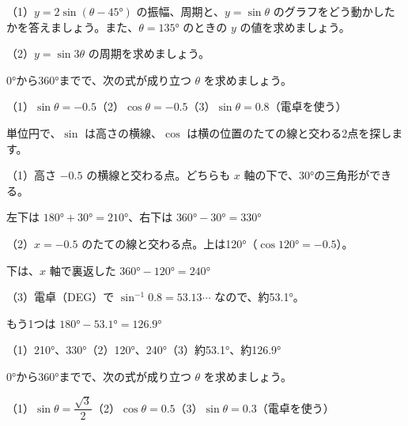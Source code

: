 \begin{jibun}
（1）$y=2\sin(\theta-45°)$ の振幅、周期と、$y=\sin\theta$ のグラフをどう動かしたかを答えましょう。また、$\theta=135°$ のときの $y$ の値を求めましょう。\par
（2）$y=\sin3\theta$ の周期を求めましょう。
\end{jibun}

\begin{reidai}[$\sin\theta=k$、$\cos\theta=k$ になる角]
0°から360°までで、次の式が成り立つ $\theta$ を求めましょう。\par
（1）$\sin\theta=-0.5$\quad（2）$\cos\theta=-0.5$\quad（3）$\sin\theta=0.8$（電卓を使う）\par
\kangaekata 単位円で、$\sin$ は高さの横線、$\cos$ は横の位置のたての線と交わる2点を探します。\par
\shiki{}\zw{} （1）高さ $-0.5$ の横線と交わる点。どちらも $x$ 軸の下で、30°の三角形ができる。\par
\bkivib 左下は $180°+30°=210°$、右下は $360°-30°=330°$\par
\bkiviq （2）$x=-0.5$ のたての線と交わる点。上は120°（$\cos120°=-0.5$）。\par
\bkivib 下は、$x$ 軸で裏返した $360°-120°=240°$\par
\bkiviq （3）電卓（DEG）で $\sin^{-1}0.8=53.13\cdots$ なので、約53.1°。\par
\bkivib もう1つは $180°-53.1°=126.9°$\par
\kotae{}\zw{} （1）210°、330°\quad（2）120°、240°\quad（3）約53.1°、約126.9°
\end{reidai}

\begin{jibun}
0°から360°までで、次の式が成り立つ $\theta$ を求めましょう。\par
（1）$\sin\theta=\dfrac{\sqrt3}{2}$\quad（2）$\cos\theta=0.5$\quad（3）$\sin\theta=0.3$（電卓を使う）
\end{jibun}

